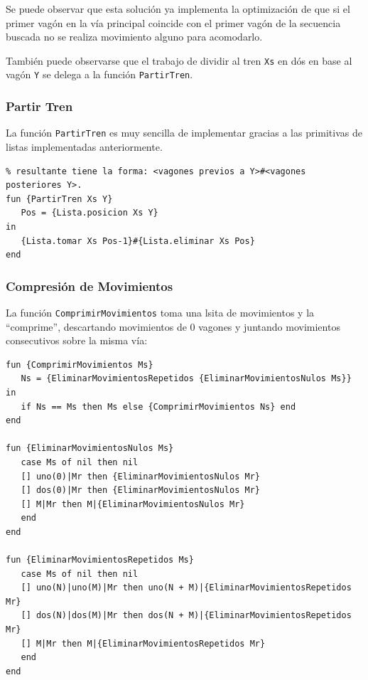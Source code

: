 \documentclass[12pt,titlepage]{article}
\begin{document}
Se puede observar que esta solución ya implementa la optimización de que si el primer vagón en la vía principal coincide con el primer vagón de la secuencia buscada no se realiza movimiento alguno para acomodarlo.

También puede observarse que el trabajo de dividir al tren \lstinline$Xs$ en dós en base al vagón \lstinline$Y$ se delega a la función \lstinline|PartirTren|.

\subsubsection{Partir Tren}

La función \lstinline|PartirTren| es muy sencilla de implementar gracias a las primitivas de listas implementadas anteriormente.
\begin{lstlisting}[basicstyle=\ttfamily\footnotesize]
% Devuelve la tupla que resulta de partir el tren Xs por el vagón Y. La tupla
% resultante tiene la forma: <vagones previos a Y>#<vagones posteriores Y>.
fun {PartirTren Xs Y}
   Pos = {Lista.posicion Xs Y}
in
   {Lista.tomar Xs Pos-1}#{Lista.eliminar Xs Pos}
end
\end{lstlisting}

\subsubsection{Compresión de Movimientos}

La función \lstinline|ComprimirMovimientos| toma una lsita de movimientos y la ``comprime'', descartando movimientos de 0 vagones y juntando movimientos consecutivos sobre la misma vía:
\begin{lstlisting}[basicstyle=\ttfamily\footnotesize]
fun {ComprimirMovimientos Ms}
   Ns = {EliminarMovimientosRepetidos {EliminarMovimientosNulos Ms}}
in
   if Ns == Ms then Ms else {ComprimirMovimientos Ns} end
end

fun {EliminarMovimientosNulos Ms} 
   case Ms of nil then nil
   [] uno(0)|Mr then {EliminarMovimientosNulos Mr}
   [] dos(0)|Mr then {EliminarMovimientosNulos Mr}
   [] M|Mr then M|{EliminarMovimientosNulos Mr}
   end
end

fun {EliminarMovimientosRepetidos Ms} 
   case Ms of nil then nil
   [] uno(N)|uno(M)|Mr then uno(N + M)|{EliminarMovimientosRepetidos Mr}
   [] dos(N)|dos(M)|Mr then dos(N + M)|{EliminarMovimientosRepetidos Mr}
   [] M|Mr then M|{EliminarMovimientosRepetidos Mr}
   end
end
\end{lstlisting}
\end{document}
